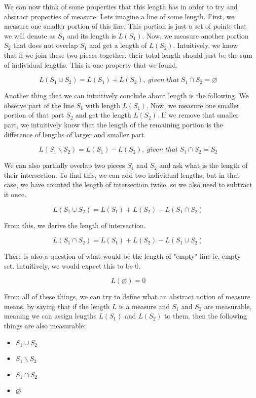 \documentclass{article}
\begin{document}
We can now think of some properties that this length has in order to try and abstract properties of measure. Lets imagine a line of some length. First, we measure one smaller portion of this line. This portion is just a set of points that we will denote as $S_1$ and its length is $L(S_1)$. Now, we measure another portion $S_2$ that does not overlap $S_1$ and get a length of $L(S_2)$. Intuitively, we know that if we join these two pieces together, their total length should just be the sum of individual lengths. This is one property that we found.

\[ L(S_1 \cup S_2) = L(S_1) + L(S_2),\;given\;that\; S_1 \cap S_2 = \varnothing \]

Another thing that we can intuitively conclude about length is the following. We observe part of the line $S_1$ with length $L(S_1)$. Now, we measure one smaller portion of that part $S_2$ and get the length $L(S_2)$. If we remove that smaller part, we intuitively know that the length of the remaining portion is the difference of lengths of larger and smaller part.

\[ L(S_1 \backslash S_2) = L(S_1) - L(S_2),\;given\;that\; S_1 \cap S_2 = S_2 \]

We can also partially overlap two pieces $S_1$ and $S_2$ and ask what is the length of their intersection. To find this, we can add two individual lengths, but in that case, we have counted the length of intersection twice, so we also need to subtract it once.

\[ L(S_1 \cup S_2) = L(S_1) + L(S_2) - L(S_1 \cap S_2) \]

From this, we derive the length of intersection.

\[ L(S_1 \cap S_2) = L(S_1) + L(S_2) - L(S_1 \cup S_2) \]

There is also a question of what would be the length of "empty" line ie. empty set. Intuitively, we would expect this to be 0.

\[ L(\varnothing) = 0 \]

From all of these things, we can try to define what an abstract notion of measure means, by saying that if the length $L$ is a measure and $S_1$ and $S_2$ are measurable, meaning we can assign lengths $L(S_1)$ and $L(S_2)$ to them, then the following things are also measurable:

\begin{itemize}
    \item $S_1 \cup S_2$
    \item $S_1 \backslash S_2$
    \item $S_1 \cap S_2$
    \item $\varnothing$
\end{itemize}
\end{document}
